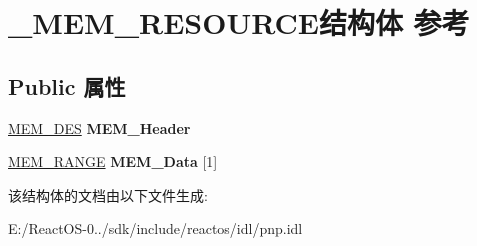 \hypertarget{struct___m_e_m___r_e_s_o_u_r_c_e}{}\section{\+\_\+\+M\+E\+M\+\_\+\+R\+E\+S\+O\+U\+R\+C\+E结构体 参考}
\label{struct___m_e_m___r_e_s_o_u_r_c_e}
\subsection*{Public 属性}
\begin{DoxyCompactItemize}
\item 
\mbox{\label{struct___m_e_m___r_e_s_o_u_r_c_e_a1dd6203d39feb2dc753a35382131fb94}} 
\hyperlink{struct_mem___des__s}{M\+E\+M\+\_\+\+D\+ES} {\bfseries M\+E\+M\+\_\+\+Header}
\item 
\mbox{\label{struct___m_e_m___r_e_s_o_u_r_c_e_acaa22eba0b5a995816de4361ceb2b1e4}} 
\hyperlink{struct_mem___range__s}{M\+E\+M\+\_\+\+R\+A\+N\+GE} {\bfseries M\+E\+M\+\_\+\+Data} \mbox{[}1\mbox{]}
\end{DoxyCompactItemize}


该结构体的文档由以下文件生成\+:\begin{DoxyCompactItemize}
\item 
E\+:/\+React\+O\+S-\/0../sdk/include/reactos/idl/pnp.\+idl\end{DoxyCompactItemize}
